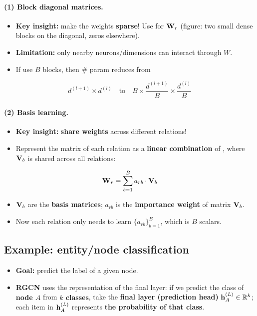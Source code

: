 \paragraph{(1) Block diagonal matrices.}
\begin{itemize}
  \item \textbf{Key insight:} make the weights \textbf{sparse}! Use
     for $\mathbf{W}_r$ (figure: two small dense blocks
    on the diagonal, zeros elsewhere).
  \item \textbf{Limitation:} only nearby neurons/dimensions can interact through
    $W$.
  \item If use $B$ blocks, then \# param reduces from
\end{itemize}
\begin{equation}\label{eq:lec09-block}
  d^{(l+1)}\times d^{(l)} \quad\text{to}\quad
  B\times\frac{d^{(l+1)}}{B}\times\frac{d^{(l)}}{B}
\end{equation}

\paragraph{(2) Basis learning.}
\begin{itemize}
  \item \textbf{Key insight:} \textbf{share weights} across different relations!
  \item Represent the matrix of each relation as a \textbf{linear combination}
    of , where $\mathbf{V}_b$ is shared across all
    relations:
\end{itemize}
\begin{equation}\label{eq:lec09-basis}
  \mathbf{W}_r = \sum_{b=1}^{B} a_{rb}\cdot\mathbf{V}_b
\end{equation}
\begin{itemize}
  \item $\mathbf{V}_b$ are the \textbf{basis matrices}; $a_{rb}$ is the
    \textbf{importance weight} of matrix $\mathbf{V}_b$.
  \item Now each relation only needs to learn $\{a_{rb}\}_{b=1}^{B}$, which is
    $B$ scalars.
\end{itemize}

\subsection{Example: entity/node classification}\label{sec:lec09-nodecls}

\begin{itemize}
  \item \textbf{Goal:} predict the label of a given node.
  \item \textbf{RGCN} uses the representation of the final layer: if we predict
    the class of \textbf{node $A$} from \textbf{$k$ classes}, take the
    \textbf{final layer (prediction head)} $\mathbf{h}_A^{(L)}\in\mathbb{R}^k$; each item in
    $\mathbf{h}_A^{(L)}$ represents \textbf{the probability of that class}.
\end{itemize}

